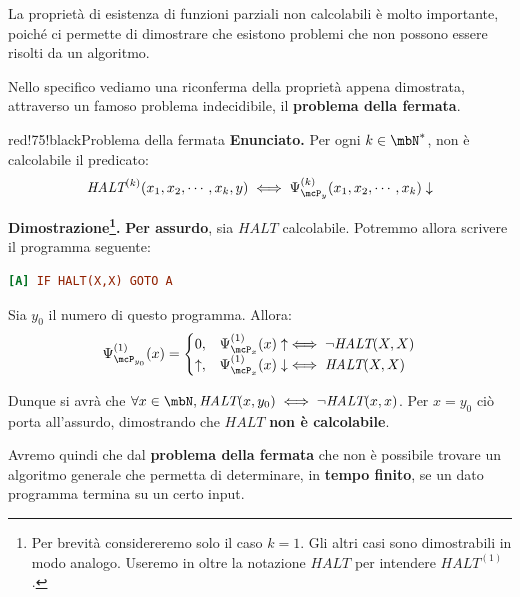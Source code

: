 La proprietà di esistenza di funzioni parziali non calcolabili è molto importante, poiché ci permette di dimostrare che esistono problemi che non possono essere risolti da un algoritmo.

Nello specifico vediamo una riconferma della proprietà appena dimostrata, attraverso un famoso problema indecidibile, il \textbf{problema della fermata}.

\newpage
\begin{halfframedbox}{red!75!black}{Problema della fermata}\label{Problema della Fermata}
  \textbf{Enunciato. } Per ogni \(k\in\mbN^*\), non è calcolabile il predicato:
  \begin{equation}
    \textit{HALT}^{(k)}(x_1,x_2,\cdots, x_k,y) \iff \Psi_{\mcP_y}^{(k)}(x_1,x_2, \cdots , x_k)\downarrow
  \end{equation}
  \begin{center}
    \textcolor{red!75!black}{\hdashrule[0.5ex]{18cm}{1pt}{3mm 3pt 1mm 2pt}}
  \end{center}

  \textbf{Dimostrazione\footnote{Per brevità considereremo solo il caso \(k=1\). Gli altri casi sono dimostrabili in modo analogo. Useremo in oltre la notazione \(\textit{HALT}\) per intendere \(\textit{HALT}^{(1)}\).}.}
  \textbf{Per assurdo}, sia \(\textit{HALT}\) calcolabile. Potremmo allora scrivere il programma seguente:
  \begin{lstlisting}[language=ini, caption=Dimotrazione Problema della Fermata]
    [A] IF HALT(X,X) GOTO A
  \end{lstlisting}
  Sia \(y_0\) il numero di questo programma. Allora:
  \begin{equation}
    \Psi_{\mcP_{y_0}}^{(1)}(x)=\begin{cases}
      0, & \Psi_{\mcP_{x}}^{(1)}(x) \uparrow \iff \neg \textit{HALT}(X,X)\\
      \uparrow, & \Psi_{\mcP_{x}}^{(1)}(x) \downarrow \iff \textit{HALT}(X,X)
    \end{cases}
  \end{equation}

  Dunque si avrà che \(\forall x \in \mbN, \textit{HALT}(x,y_0)\iff \neg \textit{HALT}(x,x)\). Per \(x=y_0\) ciò porta all'assurdo, dimostrando che \(\textit{HALT}\) \textbf{non è calcolabile}.
\end{halfframedbox}

Avremo quindi che dal \textbf{problema della fermata} che non è possibile trovare un algoritmo generale che permetta di determinare, in \textbf{tempo finito}, se un dato programma termina su un certo input.


